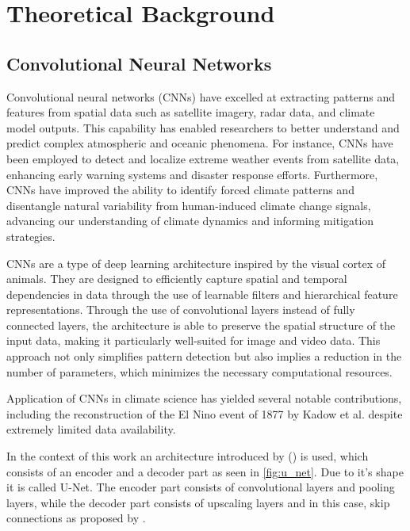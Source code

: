 \section{Theoretical Background}
\label{sec:theory}

\subsection{Convolutional Neural Networks}
\label{subsec:cnn}

Convolutional neural networks (CNNs) have excelled at extracting patterns and features from spatial data such as satellite imagery, radar data, and climate model outputs. This capability has enabled researchers to better understand and predict complex atmospheric and oceanic phenomena. For instance, CNNs have been employed to detect and localize extreme weather events from satellite data, enhancing early warning systems and disaster response efforts. Furthermore, CNNs have improved the ability to identify forced climate patterns and disentangle natural variability from human-induced climate change signals, advancing our understanding of climate dynamics and informing mitigation strategies.


CNNs are a type of deep learning architecture inspired by the visual cortex of animals. They are designed to efficiently capture spatial and temporal dependencies in data through the use of learnable filters and hierarchical feature representations. Through the use of convolutional layers instead of fully connected layers, the architecture is able to preserve the spatial structure of the input data, making it particularly well-suited for image and video data. This approach not only simplifies pattern detection but also implies a reduction in the number of parameters, which minimizes the necessary computational resources.

Application of CNNs in climate science has yielded several notable contributions, including the reconstruction of the El Nino event of 1877 by Kadow et al. despite extremely limited data availability. \cite{kadow2020}

In the context of this work an architecture introduced by (\cite{ronneberger2015}) is used, which consists of an encoder and a decoder part as seen in \autoref{fig:u_net}. Due to it's shape it is called U-Net. The encoder part consists of convolutional layers and pooling layers, while the decoder part consists of upscaling layers and in this case, skip connections as proposed by \cite{liu2018inpaining}.

